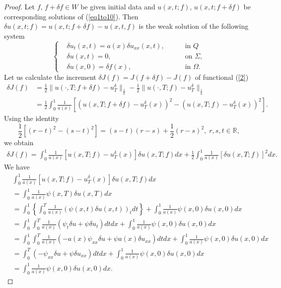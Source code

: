 \documentclass[reqno]{amsart}
\theoremstyle{plain}
\theoremstyle{remark}
\numberwithin{equation}{section}
\begin{document}
\begin{proof}
    Let $f,\, f+\delta f \in W$ be given initial data and $u(x,t;f), \, u(x,t;f+\delta f)$ be corresponding solutions of (\ref{eq1to10}). Then 
    $\delta u(x,t;f)=u(x,t;f+\delta f)-u(x,t,f)$
    is the weak  solution of the following system
\begin{equation}
    \left\{
\begin{aligned}
&\delta u_{t}(x,t) = a(x) \delta u_{xx}(x,t),&&\quad \text { in } Q\\
&\delta u(x,t)=0, &&\quad \text { on } \Sigma,\\
& \delta u(x,0)=\delta f(x), &&\quad \text { in } \Omega.
\label{eq1to6}
\end{aligned}
\right.
\end{equation}
Let us calculate the increment $\delta J(f)=J(f+\delta f)-J(f)$ of functional (\ref{2})
\begin{align*}
    \delta J(f)&=\frac{1}{2}\|u(\cdot,T;f+\delta f)-u^{\delta}_T\|_{\frac{1}{a}}-\frac{1}{2}\|u(\cdot,T;f)-u_T^{\delta}\|_{\frac{1}{a}}\\&=\frac{1}{2}\int_{0}^1\frac{1}{a(x)}\left[(u(x,T;f+\delta f)-u^{\delta}_T(x))^2-(u(x,T;f)-u^{\delta}_T(x))^2\right].
\end{align*}
Using the identity
$$\frac{1}{2}\left[(r-t)^2-(s-t)^2\right]=(s-t)(r-s)+\frac{1}{2}(r-s)^2, \;r,s,t\in \mathbb{R},$$
we obtain
\begin{align*}
    \delta J(f)=\int_{ 0}^1\frac{1}{a(x)}\left[u(x,T;f)-u^{\delta}_{T}(x)\right]\delta u(x,T;f)dx + \frac{1}{2}\int_{0}^1 \frac{1}{a(x)} \left[\delta u(x,T;f)\right]^2 dx.
\end{align*}
We have 
\begin{equation*}
\begin{aligned}
&\int_{ 0}^1\frac{1}{a(x)}\left[u(x,T;f)-u^{\delta}_{T}(x)\right]\delta u(x,T;f)dx \\ & = \int_{ 0}^1\frac{1}{a(x)}\psi(x,T)\delta u(x,T) dx\\ &= \int_{ 0}^1 \left\lbrace \int_{0}^T \frac{1}{a(x)}\left( \psi(x,t)\delta u(x,t)\right)_{t} dt\right\rbrace + \int_{ 0}^1\frac{1}{a(x)}\psi(x,0)\delta u(x,0) dx\\ &= \int_{ 0}^1 \int_{0}^T\frac{1}{a(x)}\left( \psi_{t}\delta u + \psi \delta u_{t}\right) dt dx + \int_{ 0}^1\frac{1}{a(x)}\psi(x,0)\delta u(x,0) dx \\ & = \int_{ 0}^1 \int_{0}^T\frac{1}{a(x)}\left( -a(x)\psi_{xx}\delta u + \psi a(x)\delta u_{xx}\right) dt dx + \int_{ 0}^1\frac{1}{a(x)}\psi(x,0)\delta u(x,0) dx \\&= \int_{0}^T\left( -\psi_{xx}\delta u + \psi\delta u_{xx}\right) dt dx + \int_{ 0}^1\frac{1}{a(x)}\psi(x,0)\delta u(x,0) dx \\&= \int_{ 0}^1\frac{1}{a(x)}\psi(x,0)\delta u(x,0) dx.

\end{aligned}
\end{equation*}
\end{proof}
\end{document}
